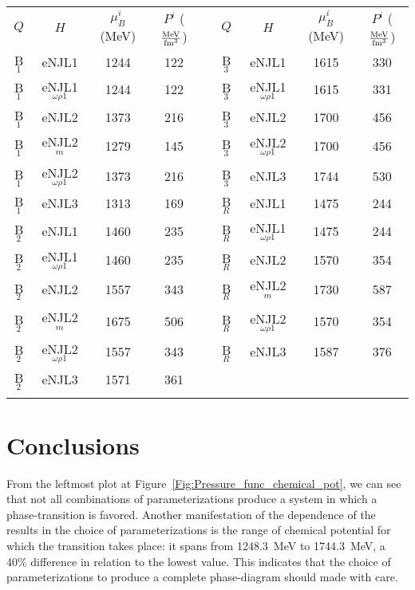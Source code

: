 \documentclass{ws-ijmpcs}
\begin{document}
\begin{table}[htb]
{\begin{tabular}{@{}ccccccccc@{}} \toprule
$Q$ & $H$ & $\mu_B^i$ (MeV) & $P^i$ ($\frac{\rm{MeV}}{\rm{fm}^3}$) && $Q$ & $H$ & $\mu_B^i$ (MeV) & $P^i$ ($\frac{\rm{MeV}}{\rm{fm}^3}$)  \\ \colrule
B$_1$ & eNJL1 & 1244 & 122                   &&  B$_3$ & eNJL1 & 1615 & 330                   \\
B$_1$ & eNJL1$_{\omega\rho 1}$ & 1244 & 122  &&  B$_3$ & eNJL1$_{\omega\rho 1}$ & 1615 & 331  \\
B$_1$ & eNJL2 & 1373 & 216                   &&  B$_3$ & eNJL2 & 1700 & 456                   \\
B$_1$ & eNJL2$^m$ & 1279 & 145               &&  B$_3$ & eNJL2$_{\omega\rho 1}$ & 1700 & 456  \\
B$_1$ & eNJL2$_{\omega\rho 1}$ & 1373 & 216  &&  B$_3$ & eNJL3 & 1744 & 530                   \\
B$_1$ & eNJL3 & 1313 & 169                   &&  B$_R$ & eNJL1 & 1475 & 244                   \\
B$_2$ & eNJL1 & 1460 & 235                   &&  B$_R$ & eNJL1$_{\omega\rho 1}$ & 1475 & 244  \\
B$_2$ & eNJL1$_{\omega\rho 1}$ & 1460 & 235  &&  B$_R$ & eNJL2 & 1570 & 354                   \\
B$_2$ & eNJL2 & 1557 & 343                   &&  B$_R$ & eNJL2$^m$ & 1730 & 587               \\
B$_2$ & eNJL2$^m$ & 1675 & 506               &&  B$_R$ & eNJL2$_{\omega\rho 1}$ & 1570 & 354  \\
B$_2$ & eNJL2$_{\omega\rho 1}$ & 1557 & 343  &&  B$_R$ & eNJL3 & 1587 & 376                   \\
B$_2$ & eNJL3 & 1571 & 361                   &&  \\
\botrule
\end{tabular} \label{Tab:Transition_chemical_pot}}
\end{table}


\section{Conclusions}

From the leftmost plot at Figure~\ref{Fig:Pressure_func_chemical_pot}, we can see that not all combinations of parameterizations produce a system in which a phase-transition is favored. Another manifestation of the dependence of the results in the choice of parameterizations is the range of chemical potential for which the transition takes place: it spans from 1248.3~MeV to 1744.3~MeV, a 40\% difference in relation to the lowest value. This indicates that the choice of parameterizations to produce a complete phase-diagram should made with care.
\end{document}
